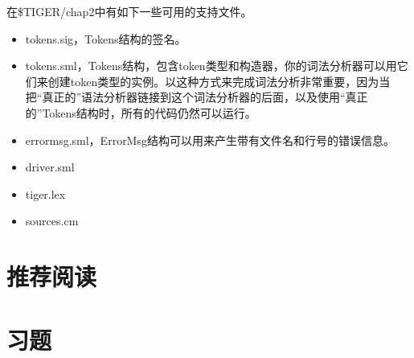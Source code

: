 \documentclass[cn,11pt,chinese]{elegantbook}
\begin{document}
在\$TIGER/chap2中有如下一些可用的支持文件。

\begin{itemize}
  \item tokens.sig，Tokens结构的签名。
  \item tokens.sml，Tokens结构，包含token类型和构造器，你的词法分析器可以用它们来创建token类型的实例。以这种方式来完成词法分析非常重要，因为当把“真正的”语法分析器链接到这个词法分析器的后面，以及使用“真正的”Tokens结构时，所有的代码仍然可以运行。
  \item errormsg.sml，ErrorMsg结构可以用来产生带有文件名和行号的错误信息。
  \item driver.sml
  \item tiger.lex
  \item sources.cm
\end{itemize}

\section{推荐阅读}

\section{习题}
\end{document}
